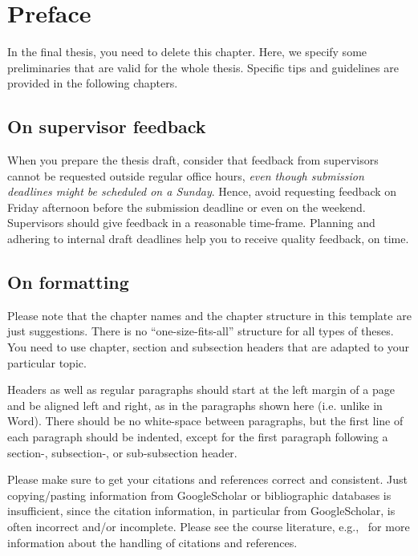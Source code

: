 \chapter{Preface}
In the final thesis, you need to delete this chapter. Here, we specify some preliminaries that are valid for the whole thesis. Specific tips and guidelines are provided in the following chapters. 

\section{On supervisor feedback}
When you prepare the thesis draft, consider that feedback from supervisors cannot be requested outside regular office hours, \emph{even though submission deadlines might be scheduled on a Sunday}. Hence, avoid requesting feedback on Friday afternoon before the submission deadline or even on the weekend. Supervisors should give feedback in a reasonable time-frame. Planning and adhering to internal draft deadlines help you to receive quality feedback, on time.

\section{On formatting}
Please note that the chapter names and the chapter structure in this template are
just suggestions. There is no ``one-size-fits-all'' structure for all types of theses.
You need to use chapter, section and subsection headers that are adapted to your
particular topic.

Headers as well as regular paragraphs should start at the left margin of a page and
be aligned left and right, as in the paragraphs shown here (i.e. unlike in Word).
There should be no white-space between paragraphs, but the first line of each
paragraph should be indented, except for the first paragraph following a section-,
subsection-, or sub-subsection header.

Please make sure to get your citations and references correct and consistent.
Just copying/pasting information from GoogleScholar or bibliographic databases is insufficient,
since the citation information, in particular from GoogleScholar, is often incorrect and/or incomplete.
Please see the course literature, e.g.,~\cite{berndtsson2007thesis,evans2014write,glasman2010science,zobel2014writing}
for more information about the handling of citations and references.

